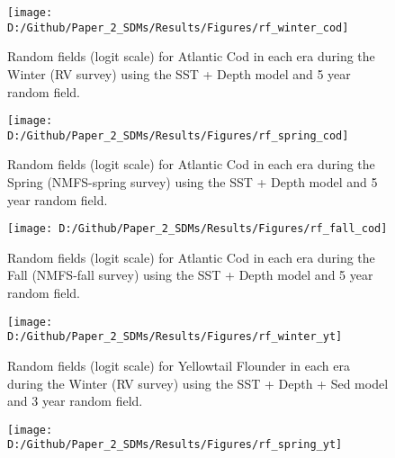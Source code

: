 \documentclass[
]{article}
\begin{document}
\begin{landscape}
\begin{figure}[htb]

{\centering \texttt{[image: D:/Github/Paper\_2\_SDMs/Results/Figures/rf\_winter\_cod]} 

}

\caption{Random fields (logit scale) for Atlantic Cod  in each era during the Winter (RV survey) using the SST + Depth model and 5 year random field.}\label{fig:rf-winter-cod}
\end{figure}

\newpage
\begin{figure}[htb]

{\centering \texttt{[image: D:/Github/Paper\_2\_SDMs/Results/Figures/rf\_spring\_cod]} 

}

\caption{Random fields (logit scale) for Atlantic Cod  in each era during the Spring (NMFS-spring survey) using the SST + Depth model and 5 year random field.}\label{fig:rf-spring-cod}
\end{figure}

\newpage
\begin{figure}[htb]

{\centering \texttt{[image: D:/Github/Paper\_2\_SDMs/Results/Figures/rf\_fall\_cod]} 

}

\caption{Random fields (logit scale) for Atlantic Cod  in each era during the Fall (NMFS-fall survey) using the SST + Depth model and 5 year random field.}\label{fig:rf-fall-cod}
\end{figure}

\newpage
\begin{figure}[htb]

{\centering \texttt{[image: D:/Github/Paper\_2\_SDMs/Results/Figures/rf\_winter\_yt]} 

}

\caption{Random fields (logit scale) for Yellowtail Flounder in each era during the Winter (RV survey) using the SST + Depth + Sed model and 3 year random field.}\label{fig:rf-winter-yt}
\end{figure}

\newpage
\begin{figure}[htb]

{\centering \texttt{[image: D:/Github/Paper\_2\_SDMs/Results/Figures/rf\_spring\_yt]} 

}


\end{figure}
\end{landscape}
\end{document}
